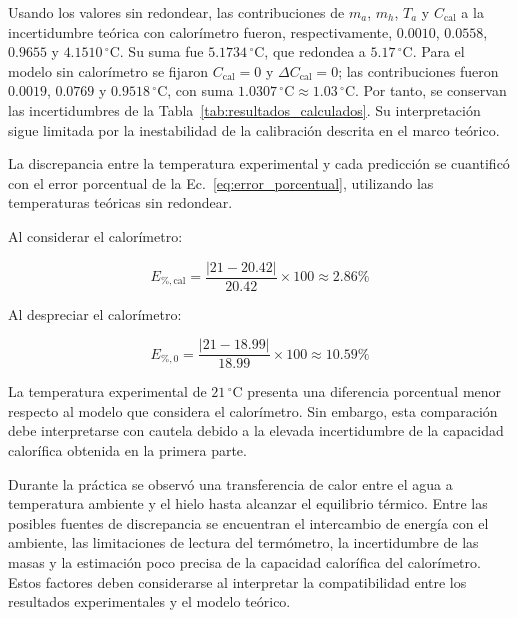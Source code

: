 Usando los valores sin redondear, las contribuciones de $m_a$, $m_h$, $T_a$ y $C_{\mathrm{cal}}$ a la incertidumbre teórica con calorímetro fueron, respectivamente, $0.0010$, $0.0558$, $0.9655$ y $4.1510\,{}^{\circ}\mathrm{C}$. Su suma fue $5.1734\,{}^{\circ}\mathrm{C}$, que redondea a $5.17\,{}^{\circ}\mathrm{C}$. Para el modelo sin calorímetro se fijaron $C_{\mathrm{cal}}=0$ y $\Delta C_{\mathrm{cal}}=0$; las contribuciones fueron $0.0019$, $0.0769$ y $0.9518\,{}^{\circ}\mathrm{C}$, con suma $1.0307\,{}^{\circ}\mathrm{C}\approx1.03\,{}^{\circ}\mathrm{C}$. Por tanto, se conservan las incertidumbres de la Tabla~\ref{tab:resultados_calculados}. Su interpretación sigue limitada por la inestabilidad de la calibración descrita en el marco teórico.

La discrepancia entre la temperatura experimental y cada predicción se cuantificó con el error porcentual de la Ec.~\eqref{eq:error_porcentual}, utilizando las temperaturas teóricas sin redondear.

Al considerar el calorímetro:

\begin{equation*}
    E_{\%,\mathrm{cal}}=
    \frac{|21-20.42|}{20.42}\times100
    \approx2.86\%
\end{equation*}

Al despreciar el calorímetro:

\begin{equation*}
    E_{\%,0}=
    \frac{|21-18.99|}{18.99}\times100
    \approx10.59\%
\end{equation*}

La temperatura experimental de $21\,^\circ\mathrm{C}$ presenta una diferencia porcentual menor respecto al modelo que considera el calorímetro. Sin embargo, esta comparación debe interpretarse con cautela debido a la elevada incertidumbre de la capacidad calorífica obtenida en la primera parte.

Durante la práctica se observó una transferencia de calor entre el agua a temperatura ambiente y el hielo hasta alcanzar el equilibrio térmico. Entre las posibles fuentes de discrepancia se encuentran el intercambio de energía con el ambiente, las limitaciones de lectura del termómetro, la incertidumbre de las masas y la estimación poco precisa de la capacidad calorífica del calorímetro. Estos factores deben considerarse al interpretar la compatibilidad entre los resultados experimentales y el modelo teórico.